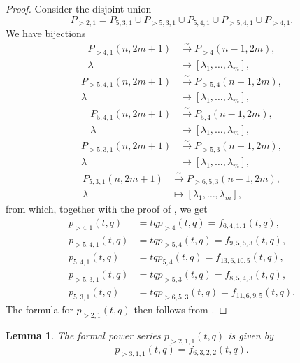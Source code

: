 \documentclass[a4paper, 12pt, reqno]{amsart}
\newtheorem{lemma}[theorem]{Lemma}
\theoremstyle{remark}
\numberwithin{equation}{subsection}
\begin{document}
\begin{proof}
  Consider the disjoint union
  \begin{equation*}
    P_{>2, 1} = P_{5, 3, 1} \cup P_{>5, 3, 1} \cup P_{5, 4, 1} \cup P_{>5, 4, 1} \cup P_{>4, 1}.
  \end{equation*}
  We have bijections
  \begin{align*}
    P_{>4, 1}(n, 2m + 1) &\xrightarrow{\sim} P_{>4}(n - 1, 2m), \\
    \lambda &\mapsto [\lambda_1, \dots, \lambda_m],
  \end{align*}
  \begin{align*}
    P_{>5, 4, 1}(n, 2m + 1) &\xrightarrow{\sim} P_{>5, 4}(n - 1, 2m), \\
    \lambda &\mapsto [\lambda_1, \dots, \lambda_m],
  \end{align*}
  \begin{align*}
    P_{5, 4, 1}(n, 2m + 1) &\xrightarrow{\sim} P_{5, 4}(n - 1, 2m), \\
    \lambda &\mapsto [\lambda_1, \dots, \lambda_m],
  \end{align*}
  \begin{align*}
    P_{>5, 3, 1}(n, 2m + 1) &\xrightarrow{\sim} P_{>5, 3}(n - 1, 2m), \\
    \lambda &\mapsto [\lambda_1, \dots, \lambda_m],
  \end{align*}
  \begin{align*}
    P_{5, 3, 1}(n, 2m + 1) &\xrightarrow{\sim} P_{>6, 5, 3}(n - 1, 2m), \\
    \lambda &\mapsto [\lambda_1, \dots, \lambda_m],
  \end{align*}
  from which, together with the proof of , we get
  \begin{align*}
    p_{>4, 1}(t, q) &= tqp_{>4}(t, q) = f_{6, 4, 1, 1}(t, q), \\
    p_{>5, 4, 1}(t, q) &= tqp_{>5, 4}(t, q) = f_{9, 5, 5, 3}(t, q), \\
    p_{5, 4, 1}(t, q) &= tqp_{5, 4}(t, q) = f_{13, 6, 10, 5}(t, q), \\
    p_{>5, 3, 1}(t, q) &= tqp_{>5, 3}(t, q) = f_{8, 5, 4, 3}(t, q), \\
    p_{5, 3, 1}(t, q) &= tqp_{>6, 5, 3}(t, q) = f_{11, 6, 9, 5}(t, q).
  \end{align*}
  The formula for $p_{>2, 1}(t, q)$ then follows from .
\end{proof}

\begin{lemma}
  \label{lmm:23}
  The formal power series $p_{>2, 1, 1}(t, q)$ is given by
  \begin{equation*}
    p_{>3, 1, 1}(t, q) = f_{6, 3, 2, 2}(t, q).
  \end{equation*}
\end{lemma}
\end{document}
